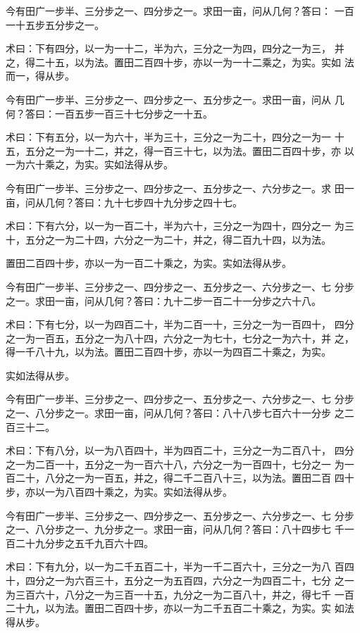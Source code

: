 \documentclass[a4paper,12pt,UTF8,twoside]{ctexbook}
\begin{document}
今有田广一步半、三分步之一、四分步之一。求田一亩，问从几何？答曰： 一百一十五步五分步之一。

术曰：下有四分，以一为一十二，半为六，三分之一为四，四分之一为三， 并之，得二十五，以为法。置田二百四十步，亦以一为一十二乘之，为实。实如 法而一，得从步。

今有田广一步半、三分步之一、四分步之一、五分步之一。求田一亩，问从 几何？答曰：一百五步一百三十七分步之一十五。

术曰：下有五分，以一为六十，半为三十，三分之一为二十，四分之一为一 十五，五分之一为一十二，并之，得一百三十七，以为法。置田二百四十步，亦 以一为六十乘之，为实。实如法得从步。

今有田广一步半、三分步之一、四分步之一、五分步之一、六分步之一。求 田一亩，问从几何？答曰：九十七步四十九分步之四十七。

术曰：下有六分，以一为一百二十，半为六十，三分之一为四十，四分之一 为三十，五分之一为二十四，六分之一为二十，并之，得二百九十四，以为法。

置田二百四十步，亦以一为一百二十乘之，为实。实如法得从步。

今有田广一步半、三分步之一、四分步之一、五分步之一、六分步之一、七 分步之一。求田一亩，问从几何？答曰：九十二步一百二十一分步之六十八。

术曰：下有七分，以一为四百二十，半为二百一十，三分之一为一百四十， 四分之一为一百五，五分之一为八十四，六分之一为七十，七分之一为六十，并 之，得一千八十九，以为法。置田二百四十步，亦以一为四百二十乘之，为实。

实如法得从步。

今有田广一步半、三分步之一、四分步之一、五分步之一、六分步之一、七 分步之一、八分步之一。求田一亩，问从几何？答曰：八十八步七百六十一分步 之二百三十二。

术曰：下有八分，以一为八百四十，半为四百二十，三分之一为二百八十， 四分之一为二百一十，五分之一为一百六十八，六分之一为一百四十，七分之一 为一百二十，八分之一为一百五，并之，得二千二百八十三，以为法。置田二百 四十步，亦以一为八百四十乘之，为实。实如法得从步。

今有田广一步半、三分步之一、四分步之一、五分步之一、六分步之一、七 分步之一、八分步之一、九分步之一。求田一亩，问从几何？答曰：八十四步七 千一百二十九分步之五千九百六十四。

术曰：下有九分，以一为二千五百二十，半为一千二百六十，三分之一为八 百四十，四分之一为六百三十，五分之一为五百四，六分之一为四百二十，七分 之一为三百六十，八分之一为三百一十五，九分之一为二百八十，并之，得七千 一百二十九，以为法。置田二百四十步，亦以一为二千五百二十乘之，为实。实 如法得从步。
\end{document}
